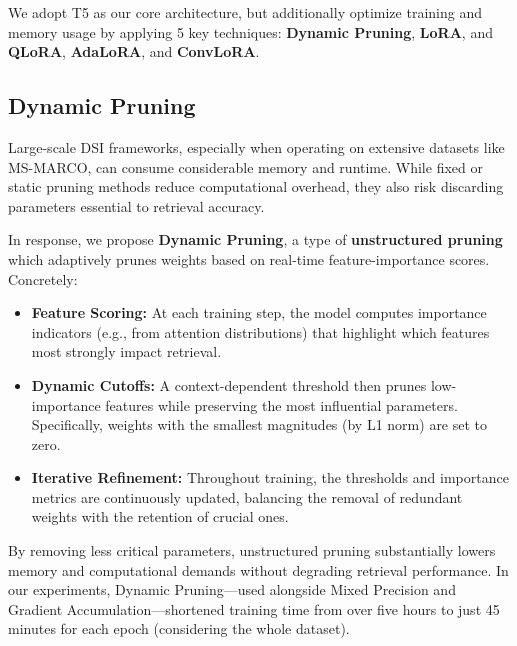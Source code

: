 We adopt T5 as our core architecture, but additionally optimize training and memory usage by applying 5 key techniques: \textbf{Dynamic Pruning}, \textbf{LoRA}\cite{hu2021loralowrankadaptationlarge}, and \textbf{QLoRA}\cite{dettmers2023qloraefficientfinetuningquantized}, \textbf{AdaLoRA}\cite{liu2024aloraallocatinglowrankadaptation}, and \textbf{ConvLoRA}\cite{aleem2024convloraadabnbaseddomain}. 

\subsection{Dynamic Pruning}
Large-scale DSI frameworks, especially when operating on extensive datasets like MS-MARCO\cite{bajaj2018msmarcohumangenerated}, can consume considerable memory and runtime. While fixed or static pruning methods reduce computational overhead, they also risk discarding parameters essential to retrieval accuracy.

In response, we propose \textbf{Dynamic Pruning}, a type of \textbf{unstructured pruning} which adaptively prunes weights based on real-time feature-importance scores. Concretely:
\begin{itemize}
    \item \textbf{Feature Scoring:} At each training step, the model computes importance indicators (e.g., from attention distributions) that highlight which features most strongly impact retrieval.
    \item \textbf{Dynamic Cutoffs:} A context-dependent threshold then prunes low-importance features while preserving the most influential parameters. Specifically, weights with the smallest magnitudes (by L1 norm) are set to zero.
    \item \textbf{Iterative Refinement:} Throughout training, the thresholds and importance metrics are continuously updated, balancing the removal of redundant weights with the retention of crucial ones. 
\end{itemize}
By removing less critical parameters, unstructured pruning substantially lowers memory and computational demands without degrading retrieval performance. In our experiments, Dynamic Pruning—used alongside Mixed Precision and Gradient Accumulation—shortened training time from over five hours to just 45 minutes for each epoch (considering the whole dataset). 

